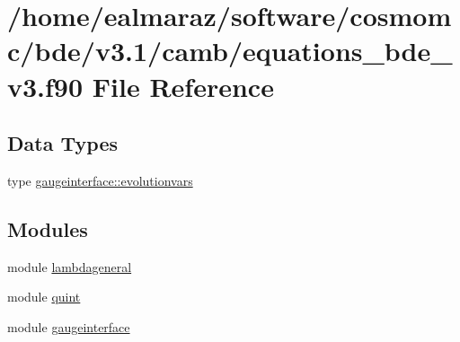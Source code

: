 \hypertarget{equations__bde__v3_8f90}{}\section{/home/ealmaraz/software/cosmomc/bde/v3.1/camb/equations\+\_\+bde\+\_\+v3.f90 File Reference}
\label{equations__bde__v3_8f90}
\subsection*{Data Types}
\begin{DoxyCompactItemize}
\item 
type \mbox{\hyperlink{structgaugeinterface_1_1evolutionvars}{gaugeinterface\+::evolutionvars}}
\end{DoxyCompactItemize}
\subsection*{Modules}
\begin{DoxyCompactItemize}
\item 
module \mbox{\hyperlink{namespacelambdageneral}{lambdageneral}}
\item 
module \mbox{\hyperlink{namespacequint}{quint}}
\item 
module \mbox{\hyperlink{namespacegaugeinterface}{gaugeinterface}}
\end{DoxyCompactItemize}
